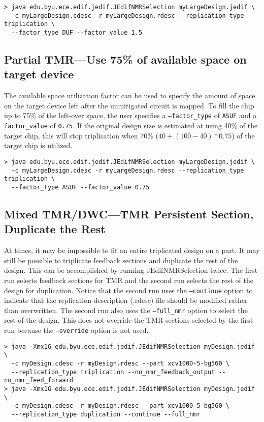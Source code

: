 \begin{verbatim}
> java edu.byu.ece.edif.jedif.JEdifNMRSelection myLargeDesign.jedif \
  -c myLargeDesign.cdesc -r myLargeDesign.rdesc --replication_type triplication \
  --factor_type DUF --factor_value 1.5
\end{verbatim}

\subsection{Partial TMR---Use 75\% of available space on target device}
The available space utilization factor can be used to specify the amount of
space on the target device left after the unmitigated circuit is mapped. To
fill the chip up to 75\% of the left-over space, the user specifies a 
\texttt{--factor\_type} of \texttt{ASUF} and a \texttt{factor\_value} of 
\texttt{0.75}. If the original design size is estimated at using 40\% of the
target chip, this will stop triplication when 70\% ($40 + (100-40)*0.75$) of
the target chip is utilized.

\begin{verbatim}
> java edu.byu.ece.edif.jedif.JEdifNMRSelection myLargeDesign.jedif \
  -c myLargeDesign.cdesc -r myLargeDesign.rdesc --replication_type triplication \
  --factor_type ASUF --factor_value 0.75
\end{verbatim}

\subsection{Mixed TMR/DWC---TMR Persistent Section, Duplicate the Rest}
At times, it may be impossible to fit an entire triplicated design on a part.
It may still be possible to triplicate feedback sections and duplicate the rest
of the design. This can be accomplished by running JEdifNMRSelection twice. The
first run selects feedback sections for TMR and the second run selects the rest
of the design for duplication. Notice that the second run uses the
\texttt{--continue} option to indicate that the replication description
(.rdesc) file should be modified rather than overwritten. The second run also
uses the \texttt{--full\_nmr} option to select the rest of the design. This does
not override the TMR sections selected by the first run because the
\texttt{--override} option is not used.
\begin{verbatim}
> java -Xmx1G edu.byu.ece.edif.jedif.JEdifNMRSelection myDesign.jedif \
  -c myDesign.cdesc -r myDesign.rdesc --part xcv1000-5-bg560 \
  --replication_type triplication --no_nmr_feedback_output --no_nmr_feed_forward
> java -Xmx1G edu.byu.ece.edif.jedif.JEdifNMRSelection myDesign.jedif \
  -c myDesign.cdesc -r myDesign.rdesc --part xcv1000-5-bg560 \
  --replication_type duplication --continue --full_nmr
\end{verbatim}

